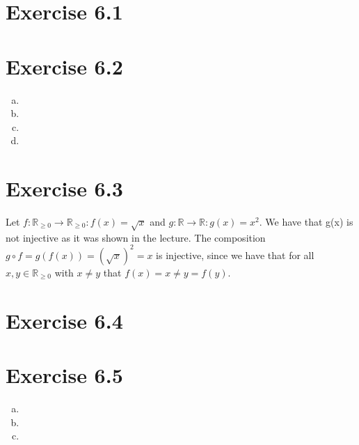 \documentclass{article} %
\newcommand{\homeworkNumber}{6}
\begin{document}
\section*{Exercise \homeworkNumber.1}




\section*{Exercise \homeworkNumber.2}

\begin{enumerate}[(a)]
	\item
	\item
	\item
	\item
\end{enumerate}



\section*{Exercise \homeworkNumber.3}
Let \( f \colon \mathbb{R}_{\geq 0} \to \mathbb{R}_{\geq 0} \colon f(x) = \sqrt{x}  \)
and \( g \colon \mathbb{R} \to \mathbb{R} \colon g(x) = x^2  \).
We have that g(x) is not injective as it was shown in the lecture.
The composition \( g \circ f = g(f(x)) = (\sqrt{x})^2 = x \) is injective,
since we have that for all \( x,y \in  \mathbb{R}_{\geq 0} \) with \( x \neq y \) that \( f(x) = x \neq y = f(y) \).



\section*{Exercise \homeworkNumber.4}



\section*{Exercise \homeworkNumber.5}
\begin{enumerate}[(a)]
	\item
	\item
	\item
\end{enumerate}
\end{document}

